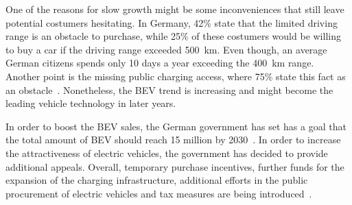 One of the reasons for slow growth might be some inconveniences that still leave potential costumers hesitating. In Germany, 42\% state that the limited driving range is an obstacle to purchase, while 25\% of these costumers would be willing to buy a car if the driving range exceeded 500~km. Even though, an average German citizens spends only 10 days a year exceeding the 400~km range. Another point is the missing public charging access, where 75\% state this fact as an obstacle~\cite{ConsorsFinanz_2019}. Nonetheless, the BEV trend is increasing and might become the leading vehicle technology in later years. %

In order to boost the BEV sales, the German government has set has a goal that the total amount of BEV should reach 15 million by 2030~\cite{FrankSonntag_2021}. In order to increase the attractiveness of electric vehicles, the government has decided to provide additional appeals. Overall, temporary purchase incentives, further funds for the expansion of the charging infrastructure, additional efforts in the public procurement of electric vehicles and tax measures are being introduced~\cite{elektromobilität_2022}.